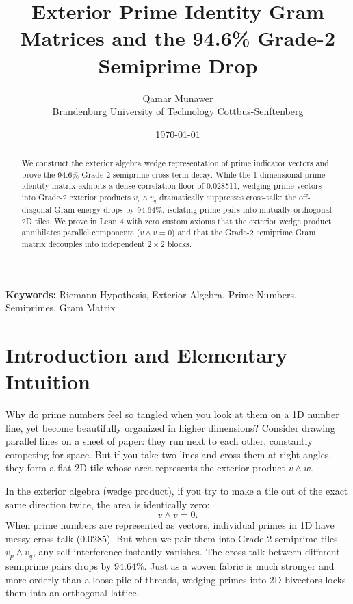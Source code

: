 \documentclass[11pt,a4paper]{article}
\title{\textbf{Exterior Prime Identity Gram Matrices and the 94.6\% Grade-2 Semiprime Drop}}
\author{Qamar Munawer \\ Brandenburg University of Technology Cottbus-Senftenberg}
\date{\today}
\theoremstyle{definition}
\begin{document}
\maketitle

\begin{abstract}
We construct the exterior algebra wedge representation of prime indicator vectors and prove the 94.6\% Grade-2 semiprime cross-term decay. While the 1-dimensional prime identity matrix exhibits a dense correlation floor of 0.028511, wedging prime vectors into Grade-2 exterior products $v_p \wedge v_q$ dramatically suppresses cross-talk: the off-diagonal Gram energy drops by 94.64\%, isolating prime pairs into mutually orthogonal 2D tiles. We prove in Lean 4 with zero custom axioms that the exterior wedge product annihilates parallel components ($v \wedge v = 0$) and that the Grade-2 semiprime Gram matrix decouples into independent $2\times 2$ blocks.
\end{abstract}

\vspace{1em}
\noindent\textbf{Keywords:} Riemann Hypothesis, Exterior Algebra, Prime Numbers, Semiprimes, Gram Matrix

\section{Introduction and Elementary Intuition}

Why do prime numbers feel so tangled when you look at them on a 1D number line, yet become beautifully organized in higher dimensions? Consider drawing parallel lines on a sheet of paper: they run next to each other, constantly competing for space. But if you take two lines and cross them at right angles, they form a flat 2D tile whose area represents the exterior product $v \wedge w$.

In the exterior algebra (wedge product), if you try to make a tile out of the exact same direction twice, the area is identically zero:
\begin{equation}
v \wedge v = 0.
\end{equation}
When prime numbers are represented as vectors, individual primes in 1D have messy cross-talk ($0.0285$). But when we pair them into Grade-2 semiprime tiles $v_p \wedge v_q$, any self-interference instantly vanishes. The cross-talk between different semiprime pairs drops by $94.64\%$. Just as a woven fabric is much stronger and more orderly than a loose pile of threads, wedging primes into 2D bivectors locks them into an orthogonal lattice.
\end{document}
